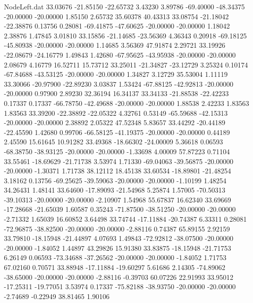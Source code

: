 \begin{filecontents}{NodeLeft.dat}
  33.03676  -21.85150  -22.65732     3.43230    3.89786  -69.40000  -48.34375  -20.00000  -20.00000    1.85150    2.65732   35.60378   40.43313
  33.08754  -21.18042  -22.38876     0.13756    0.28081  -69.41875  -47.60625  -20.00000  -20.00000    1.18042    2.38876    1.47845    3.01810
  33.15856  -21.14685  -23.56369     4.36343    0.20918  -69.18125  -45.80938  -20.00000  -20.00000    1.14685    3.56369   47.91874    2.29721
  33.19926  -22.08679  -24.16779     1.49843    1.42680  -67.95625  -43.95938  -20.00000  -20.00000    2.08679    4.16779   16.52711   15.73712
  33.25011  -21.34827  -23.12729     3.25324    0.10174  -67.84688  -43.53125  -20.00000  -20.00000    1.34827    3.12729   35.53004    1.11119
  33.30066  -20.97900  -22.89230     3.03837    1.53424  -67.88125  -42.92813  -20.00000  -20.00000    0.97900    2.89230   32.36194   16.34137
  33.34133  -21.88538  -22.42233     0.17337    0.17337  -66.78750  -42.49688  -20.00000  -20.00000    1.88538    2.42233    1.83563    1.83563
  33.39200  -22.38892  -22.05322     4.32761    0.53149  -65.59688  -42.15313  -20.00000  -20.00000    2.38892    2.05322   47.52348    5.83657
  33.44292  -20.44189  -22.45590     1.42680    0.99706  -66.58125  -41.19375  -20.00000  -20.00000    0.44189    2.45590   15.61645   10.91282
  33.49368  -18.66302  -24.00009     5.36618    0.06593  -68.38750  -38.93125  -20.00000  -20.00000   -1.33698    4.00009   57.87223    0.71104
  33.55461  -18.69629  -21.71738     3.53974    1.71330  -69.04063  -39.56875  -20.00000  -20.00000   -1.30371    1.71738   38.12112   18.45138
  33.60534  -18.89801  -21.48254     3.18162    0.13756  -69.25625  -39.59063  -20.00000  -20.00000   -1.10199    1.48254   34.26431    1.48141
  33.64600  -17.89093  -21.54968     5.25874    1.57005  -70.50313  -39.10313  -20.00000  -20.00000   -2.10907    1.54968   55.67837   16.62340
  33.69669  -17.28668  -21.65039     1.60587    0.35243  -71.87500  -38.51250  -20.00000  -20.00000   -2.71332    1.65039   16.60852    3.64498
  33.74744  -17.11884  -20.74387     6.33311    0.28081  -72.96875  -38.82500  -20.00000  -20.00000   -2.88116    0.74387   65.89155    2.92159
  33.79810  -18.15948  -21.44897     4.07693    1.49843  -72.92812  -38.07500  -20.00000  -20.00000   -1.84052    1.44897   43.29826   15.91380
  33.83875  -18.15948  -21.71753     6.26149    0.06593  -73.34688  -37.26562  -20.00000  -20.00000   -1.84052    1.71753   67.02160    0.70571
  33.88948  -17.11884  -19.60297     5.61686    2.14305  -74.89062  -38.65000  -20.00000  -20.00000   -2.88116   -0.39703   60.07226   22.91993
  33.95012  -17.25311  -19.77051     3.53974    0.17337  -75.82188  -38.93750  -20.00000  -20.00000   -2.74689   -0.22949   38.81465    1.90106

\end{filecontents}
